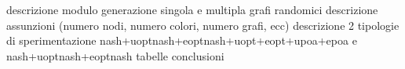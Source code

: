 descrizione modulo generazione singola e multipla grafi randomici
descrizione assunzioni (numero nodi, numero colori, numero grafi, ecc)
descrizione 2 tipologie di sperimentazione nash+uoptnash+eoptnash+uopt+eopt+upoa+epoa e nash+uoptnash+eoptnash
tabelle
conclusioni